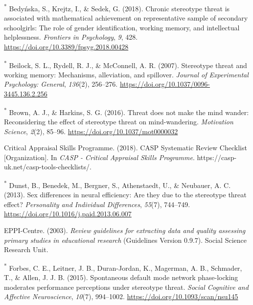 \documentclass[
  stu,floatsintext]{apa7}
\newlength{\cslhangindent}
\newenvironment{CSLReferences}[2] %
 {\begin{list}{}{%
  \setlength{\itemindent}{0pt}
  \setlength{\leftmargin}{0pt}
  \setlength{\parsep}{0pt}
  \ifodd #1
   \setlength{\leftmargin}{\cslhangindent}
   \setlength{\itemindent}{-1\cslhangindent}
  \fi
  \setlength{\itemsep}{#2\baselineskip}}}
 {\end{list}}
\begin{document}
\begin{CSLReferences}{1}{0}
\textsuperscript{*} Bedyńska, S., Krejtz, I., \& Sedek, G. (2018). Chronic stereotype threat is associated with mathematical achievement on representative sample of secondary schoolgirls: {The} role of gender identification, working memory, and intellectual helplessness. \emph{Frontiers in Psychology}, \emph{9}, 428. \url{https://doi.org/10.3389/fpsyg.2018.00428}

\textsuperscript{*} Beilock, S. L., Rydell, R. J., \& McConnell, A. R. (2007). Stereotype threat and working memory: {Mechanisms}, alleviation, and spillover. \emph{Journal of Experimental Psychology: General}, \emph{136}(2), 256--276. \url{https://doi.org/10.1037/0096-3445.136.2.256}

\textsuperscript{*} Brown, A. J., \& Harkins, S. G. (2016). Threat does not make the mind wander: {Reconsidering} the effect of stereotype threat on mind-wandering. \emph{Motivation Science}, \emph{2}(2), 85--96. \url{https://doi.org/10.1037/mot0000032}

Critical Appraisal Skills Programme. (2018). {CASP Systematic Review Checklist} {[}Organization{]}. In \emph{CASP - Critical Appraisal Skills Programme}. https://casp-uk.net/casp-tools-checklists/.

\textsuperscript{*} Dunst, B., Benedek, M., Bergner, S., Athenstaedt, U., \& Neubauer, A. C. (2013). Sex differences in neural efficiency: {Are} they due to the stereotype threat effect? \emph{Personality and Individual Differences}, \emph{55}(7), 744--749. \url{https://doi.org/10.1016/j.paid.2013.06.007}

EPPI-Centre. (2003). \emph{Review guidelines for extracting data and quality assessing primary studies in educational research} (Guidelines Version 0.9.7). Social Science Research Unit.

\textsuperscript{*} Forbes, C. E., Leitner, J. B., Duran-Jordan, K., Magerman, A. B., Schmader, T., \& Allen, J. J. B. (2015). Spontaneous default mode network phase-locking moderates performance perceptions under stereotype threat. \emph{Social Cognitive and Affective Neuroscience}, \emph{10}(7), 994--1002. \url{https://doi.org/10.1093/scan/nsu145}


\end{CSLReferences}
\end{document}
